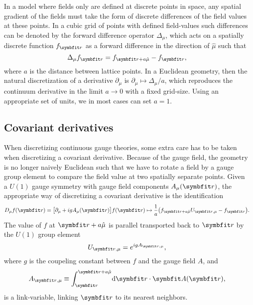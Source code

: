 In a model where fields only are defined at discrete points in space, any spatial gradient of the fields must take the form
of discrete differences of the field values at these points. In a cubic grid of points with defined field-values such
differences can be denoted by the forward difference operator $\Delta_\mu$, which acts on a spatially discrete function $f_\v{r}$
as a forward difference in the direction of $\hat{\mu}$ such that
\begin{equation}
    \label{eq:LM:Derivatives:forwardDifference}
    \Delta_\mu f_\v{r} = f_{\v{r}+a\hat{\mu}} - f_\v{r},
\end{equation}
where $a$ is the distance between lattice points.
In a Euclidean geometry, then the natural discretization of a derivative $\partial_\mu$ is $\partial_\mu \mapsto \Delta_\mu/a$, which
reproduces the continuum derivative in the limit $a\rightarrow0$ with a fixed grid-size.
Using an appropriate set of units, we in most cases can set $a=1$.

\subsection{Covariant derivatives}

When discretizing continuous gauge theories, some extra care has to be taken when discretizing a covariant
derivative. Because of the gauge field, the geometry is no longer naively Euclidean such that we have to
rotate a field by a gauge group element to compare the field value at two spatially separate points. Given
a $U(1)$ gauge symmetry with gauge field components $A_\mu(\v{r})$, the appropriate way of discretizing a covariant derivative
is the identification \cite{shimizu12}
\begin{equation}
    \label{eq:LM:Derivatives:covariantDiscreteMapping}
    D_\mu f(\v{r}) = \big[\partial_\mu + igA_\mu(\v{r})\big]f(\v{r}) \mapsto \frac{1}{a}\big(f_{\v{r}+a\hat{\mu}}U_{\v{r},\mu} - f_\v{r}\big).
\end{equation}
The value of $f$ at $\v{r}+a\hat{\mu}$ is parallel transported back to $\v{r}$ by the $U(1)$ group element \cite{Munster2000}
\begin{equation}
    \label{eq:LM:Derivatives:U1ParallelTransporter}
    U_{\v{r},\mu} = e^{igA_{\v{r},\mu}},
\end{equation}
where
$g$ is the coupeling constant between $f$ and the gauge field $A$, and
\begin{equation}
    \label{eq:LM:Derivatives:linkVariable}
    A_{\v{r},\mu} \equiv \int_\v{r}^{\v{r}+a\hat{\mu}}\!\mathrm{d}\v{r}\cdot\v{A}(\v{r}),
\end{equation}
is a link-variable, linking $\v{r}$ to its nearest neighbors.

